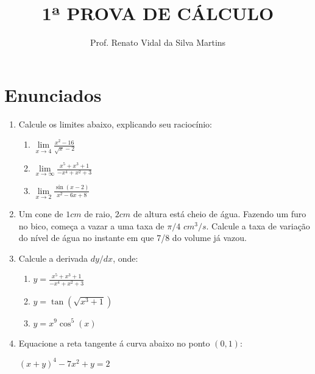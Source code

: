 \documentclass[12pt]{article}
\begin{document}
\date{}
\title{1ª PROVA DE CÁLCULO}
\author{Prof. Renato Vidal da Silva Martins}
\maketitle

\part{Enunciados}
\begin{enumerate}
	\item Calcule os limites abaixo, explicando seu raciocínio:
	\begin{enumerate}
		\item $ \lim\limits_{x \rightarrow 4} \frac{x^2-16}{\sqrt{x}-2} $
		\item $ \lim\limits_{x \rightarrow \infty} \frac{x^5+x^3+1}{-x^4+x^2+3} $
		\item $ \lim\limits_{x \rightarrow 2} \frac{\sin(x-2)}{x^2-6x+8} $
	\end{enumerate}
	\item Um cone de $1 cm$ de raio, $2 cm$ de altura está cheio de água. Fazendo um furo no bico, começa a vazar a uma taxa de $\pi/4$ $cm^3/s$. Calcule a taxa de variação do nível de água no instante em que 7/8 do volume já vazou.
	\item Calcule a derivada $dy/dx$, onde:
	\begin{enumerate}
		\item $ y = \frac{x^5+x^3+1}{-x^4+x^2+3} $
		\item $ y = \tan(\sqrt{x^3+1}) $
		\item $ y = x^9 \cos^5(x) $
	\end{enumerate}
	
	\item Equacione a reta tangente á curva abaixo no ponto $(0,1)$:
	\begin{center}
		$ \left( x + y \right)^4 -7x^2 + y = 2  $\\
	\end{center}
\end{enumerate}

\newpage
\end{document}
